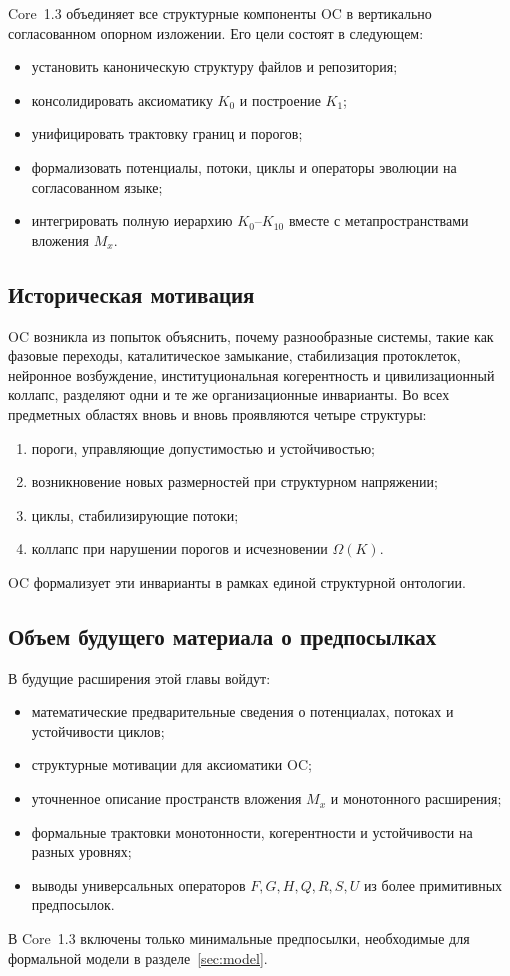 Core~1.3 объединяет все структурные компоненты OC в вертикально согласованном опорном изложении.
Его цели состоят в следующем:

\begin{itemize}
    \item установить каноническую структуру файлов и репозитория;
    \item консолидировать аксиоматику \(K_0\) и построение \(K_1\);
    \item унифицировать трактовку границ и порогов;
    \item формализовать потенциалы, потоки, циклы и операторы эволюции на согласованном языке;
    \item интегрировать полную иерархию \(K_0\)–\(K_{10}\) вместе с метапространствами вложения \(M_x\).
\end{itemize}

\subsection{Историческая мотивация}

OC возникла из попыток объяснить, почему разнообразные системы, такие как фазовые переходы, каталитическое замыкание, стабилизация протоклеток, нейронное возбуждение, институциональная когерентность и цивилизационный коллапс, разделяют одни и те же организационные инварианты.
Во всех предметных областях вновь и вновь проявляются четыре структуры:

\begin{enumerate}
    \item пороги, управляющие допустимостью и устойчивостью;
    \item возникновение новых размерностей при структурном напряжении;
    \item циклы, стабилизирующие потоки;
    \item коллапс при нарушении порогов и исчезновении \(\Omega(K)\).
\end{enumerate}

OC формализует эти инварианты в рамках единой структурной онтологии.

\subsection{Объем будущего материала о предпосылках}

В будущие расширения этой главы войдут:

\begin{itemize}
    \item математические предварительные сведения о потенциалах, потоках и устойчивости циклов;
    \item структурные мотивации для аксиоматики OC;
    \item уточненное описание пространств вложения \(M_x\) и монотонного расширения;
    \item формальные трактовки монотонности, когерентности и устойчивости на разных уровнях;
    \item выводы универсальных операторов \(F,G,H,Q,R,S,U\) из более примитивных предпосылок.
\end{itemize}

В Core~1.3 включены только минимальные предпосылки, необходимые для формальной модели в разделе~\ref{sec:model}.
